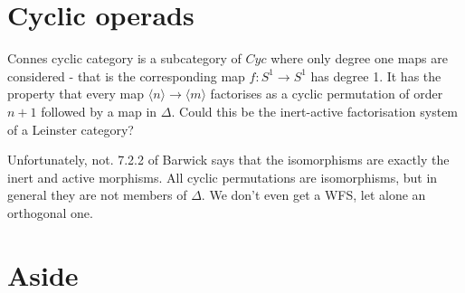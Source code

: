 \section{Cyclic operads}
Connes cyclic category is a subcategory of $Cyc$ where only degree one maps are considered - that is the corresponding map $f:S^1\rightarrow S^1$ has degree 1. It has the property that every map $\langle n \rangle \rightarrow \langle m \rangle$ factorises as a cyclic permutation of order $n+1$ followed by a map in $\Delta$. Could this be the inert-active factorisation system of a Leinster category?

Unfortunately, not. 7.2.2 of Barwick says that the isomorphisms are exactly the inert and active morphisms. All cyclic permutations are isomorphisms, but in general they are not members of $\Delta$. We don't even get a WFS, let alone an orthogonal one.

\section{Aside}
